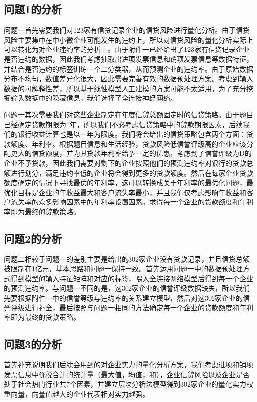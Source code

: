 \documentclass{cumcmthesis}
\begin{document}
\subsection{问题1的分析}
问题一首先需要我们对123家有信贷记录企业的信贷风险进行量化分析。由于信贷风险主要集中在中小微企业可能发生的违约上，所以对信贷风险的量化分析实际上可以转化为对企业违约率的分析上。由于附件一已经给出了123家有信贷记录企业是否违约的数据，因此我们考虑抽取出进项发票信息和销项发票信息等数据特征，并结合是否违约的标签训练一个二分类器，从而预测企业的违约率。由于原始数据分布不均匀，数值差异化很大，因此需要完善有效的数据预处理方案。考虑到输入数据的可解释性差，所以基于线性模型人工建模的方案可能不太适用，为了充分挖掘输入数据中的隐藏信息，我们选择了全连接神经网络。

问题一其次需要我们对这些企业制定在年度信贷总额固定时的信贷策略。由于题目已经确定贷款期限为1年，所以我们不必考虑信贷策略中的贷款期限因素，后续我们的银行收益计算也是以一年为限度。我们将会给出的信贷策略包含两个方面：贷款额度、年利率。根据题目信息和生活经验，贷款风险低信誉评级高的企业应该分配更大的信贷额度，并为其贷款年利率给予一定的优惠。考虑到了信誉评级为D的企业不予贷款，因此我们需要对剩下的企业按照他们的预测违约率对银行的贷款总额进行划分，满足违约率低的企业将会得到更多的贷款额度。然后在每家企业贷款额度确定的情况下寻找最优的年利率，这可以转换成关于年利率的最优化问题，最优化目标是企业的年收益最大和客户流失率最小，并且我们仅考虑影响年收益和客户流失率的众多影响因素中的年利率设置因素。求得每一个企业的贷款额度和年利率即为最终的贷款策略。
\subsection{问题2的分析}
问题二相较于问题一的差别主要是给出的302家企业没有贷款记录，并且信贷总额被限制在1亿元，基本思路和问题一保持一致。首先运用问题一中的数据预处理方式得到模型的输入特征矩阵和对应的标签，喂入全连接网络模型后得到每一个企业的预测违约率。与问题一不同的是，这302家企业的信誉评级数据缺失，所以我们先要根据附件一中的信誉等级与违约率的关系建立模型，然后对这302家企业的信誉评级进行补全，最后按照与问题一相同的方法确定每一个企业的贷款额度和年利率即为最终的贷款策略。
\subsection{问题3的分析}
首先补充说明我们后续会用到的对企业实力的量化分析方案，我们考虑进项和销项发票信息中价税合计的统计量（最大值，均值，和），企业信贷风险以及企业是否处于社会热门行业共7个因素，并建立层次分析法模型得到302家企业的量化实力权重向量，向量值越大的企业代表相对实力越强。
\end{document}
